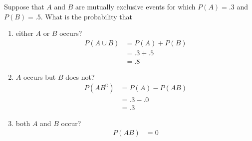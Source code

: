 \item Suppose that $A$ and $B$ are mutually exclusive events for which $P(A) = .3$ and $P(B) = .5$. What is the probability that
\begin{enumerate}
    \item either $A$ or $B$ occurs?
    \begin{align*}
        P(A\cup B)
        &= P(A) + P(B)\\
        &= .3 + .5\\
        &= .8
    \end{align*}
    \item $A$ occurs but $B$ does not?
    \begin{align*}
        P(AB^\complement )
        &= P(A) - P(AB)\\
        &= .3 - .0\\
        &= .3
    \end{align*}
    \item both $A$ and $B$ occur?
    \begin{align*}
        P(AB) &= 0
    \end{align*}
\end{enumerate}